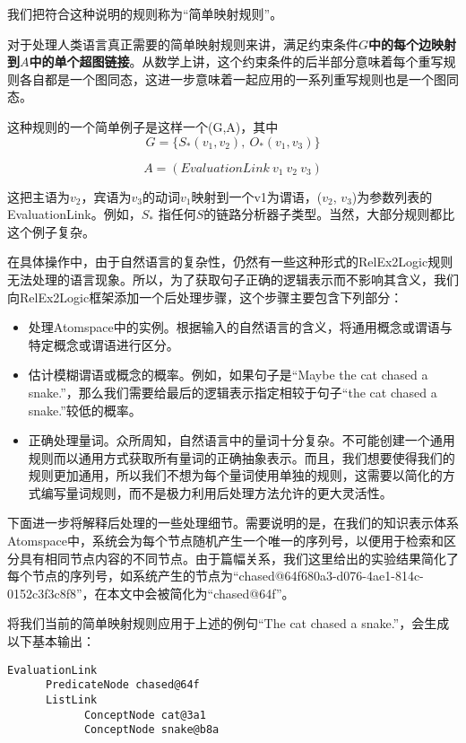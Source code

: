 我们把符合这种说明的规则称为“简单映射规则”。

对于处理人类语言真正需要的简单映射规则来讲，满足约束条件{\bf $G$中的每个边映射到$A$中的单个超图链接}。从数学上讲，这个约束条件的后半部分意味着每个重写规则各自都是一个图同态\cite{Voloshin2009}，这进一步意味着一起应用的一系列重写规则也是一个图同态。

这种规则的一个简单例子是这样一个(G,A)，其中
$$
G = \{ S_*(v_1,v_2), \ O_*(v_1, v_3) \}
$$

$$
A = (EvaluationLink \ v_1 \ v_2 \ v_3)
$$

这把主语为$v_2$，宾语为$v_3$的动词$v_1$映射到一个v1为谓语，($v_2$, $v_3$)为参数列表的EvaluationLink。例如，$S_*$ 指任何$S$的链路分析器子类型。当然，大部分规则都比这个例子复杂。

在具体操作中，由于自然语言的复杂性，仍然有一些这种形式的RelEx2Logic规则无法处理的语言现象。所以，为了获取句子正确的逻辑表示而不影响其含义，我们向RelEx2Logic框架添加一个后处理步骤，这个步骤主要包含下列部分：

\begin{itemize}
\item 处理Atomspace中的实例。根据输入的自然语言的含义，将通用概念或谓语与特定概念或谓语进行区分。
\item 估计模糊谓语或概念的概率。例如，如果句子是“Maybe the cat chased a snake.”，那么我们需要给最后的逻辑表示指定相较于句子“the cat chased a snake.”较低的概率。
\item 正确处理量词。众所周知，自然语言中的量词十分复杂。不可能创建一个通用规则而以通用方式获取所有量词的正确抽象表示。而且，我们想要使得我们的规则更加通用，所以我们不想为每个量词使用单独的规则，这需要以简化的方式编写量词规则，而不是极力利用后处理方法允许的更大灵活性。
\end{itemize}

下面进一步将解释后处理的一些处理细节。需要说明的是，在我们的知识表示体系Atomspace中，系统会为每个节点随机产生一个唯一的序列号，以便用于检索和区分具有相同节点内容的不同节点。由于篇幅关系，我们这里给出的实验结果简化了每个节点的序列号，如系统产生的节点为“chased@64f680a3-d076-4ae1-814c-0152c3f3c8f8”，在本文中会被简化为“chased@64f”。

将我们当前的简单映射规则应用于上述的例句“The cat chased a snake.”，会生成以下基本输出：

 {\tt\begin{small}\begin{lstlisting}
EvaluationLink 
      PredicateNode chased@64f
      ListLink
            ConceptNode cat@3a1
            ConceptNode snake@b8a
       
\end{lstlisting}\end{small}}


